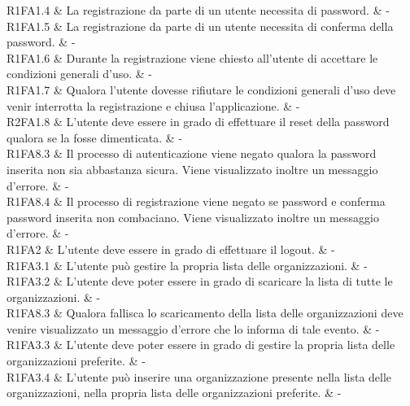 R1FA1.4 & La registrazione da parte di un utente necessita di password. & - \\

R1FA1.5 & La registrazione da parte di un utente necessita di conferma della password. & - \\

R1FA1.6 & Durante la registrazione viene chiesto all'utente di accettare le condizioni generali d'uso. & - \\

R1FA1.7 & Qualora l'utente dovesse rifiutare le condizioni generali d'uso deve venir interrotta la registrazione e chiusa l'applicazione. & - \\

R2FA1.8 & L'utente deve essere in grado di effettuare il reset della password qualora se la fosse dimenticata. & - \\

R1FA8.3 & Il processo di autenticazione viene negato qualora la password inserita non sia abbastanza sicura. Viene visualizzato inoltre un messaggio d'errore. & - \\

R1FA8.4 & Il processo di registrazione viene negato se password e conferma password inserita non combaciano. Viene visualizzato inoltre un messaggio d'errore. & - \\


R1FA2 & L'utente deve essere in grado di effettuare il logout. & - \\

R1FA3.1 & L'utente può gestire la propria lista delle organizzazioni. & - \\

R1FA3.2 & L'utente deve poter essere in grado di scaricare la lista di tutte le organizzazioni.  & - \\

R1FA8.3 & Qualora fallisca lo scaricamento della lista delle organizzazioni deve venire visualizzato un messaggio d'errore che lo informa di tale evento. & - \\

R1FA3.3 & L’utente deve poter essere in grado di gestire la propria lista delle organizzazioni preferite. & - \\

R1FA3.4 & L’utente può inserire una organizzazione presente nella lista delle organizzazioni, nella propria lista delle organizzazioni preferite.  & - \\

